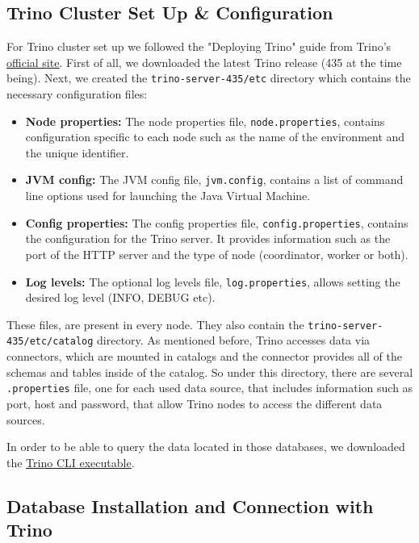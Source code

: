 \documentclass[conference]{IEEEtran}
\begin{document}
\subsection{Trino Cluster Set Up \& Configuration}

For Trino cluster set up we followed the "Deploying Trino" guide from Trino's \textcolor{linkblue}{\underline{\href{https://trino.io/docs/current/installation/deployment.html}{official site}}}.
First of all, we downloaded the latest Trino release (435 at the time being). Next, we created the \texttt{trino-server-435/etc} directory which contains the necessary configuration files:

\begin{itemize}
	\item \textbf{Node properties:} The node properties file, \texttt{node.properties}, contains configuration specific to each node such as the name of the environment and the unique identifier.
	\item \textbf{JVM config:} The JVM config file, \texttt{jvm.config}, contains a list of command line options used for launching the Java Virtual Machine.
	\item \textbf{Config properties:} The config properties file, \texttt{config.properties}, contains the configuration for the Trino server. It provides information such as the port of the HTTP server and the type of node (coordinator, worker or both).
	\item \textbf{Log levels:} The optional log levels file, \texttt{log.properties}, allows setting the desired log level (INFO, DEBUG etc).
\end{itemize}

These files, are present in every node. They also contain the \texttt{trino-server-435/etc/catalog} directory. As mentioned before, Trino accesses data via connectors, which are mounted in catalogs and the connector provides all
of the schemas and tables inside of the catalog. So under this directory, there are several \texttt{.properties} file, one for each used data source, that includes information such as port, host and password,
that allow Trino nodes to access the different data sources.

In order to be able to query the data located in those databases, we downloaded the \textcolor{linkblue}{\underline{\href{https://trino.io/docs/current/client/cli.html}{Trino CLI executable}}}.

\subsection{Database Installation and Connection with Trino}
\end{document}

